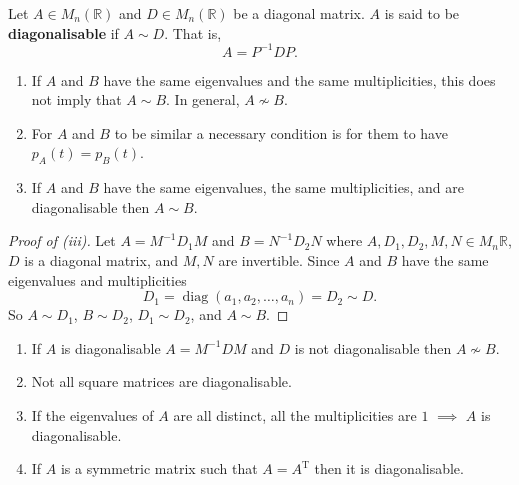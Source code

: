 \begin{definition}
    Let $A \in M_n(\mathbb{R})$ and $D \in M_n(\mathbb{R})$ be a diagonal matrix. $A$ is said to be \textbf{diagonalisable} if $A \sim D$. That is, \[ A = P^{-1} D P. \]
\end{definition}

\begin{remark}
    \begin{enumerate}
        \item If $A$ and $B$ have the same eigenvalues and the same multiplicities, this does not imply that $A \sim B$. In general, $A \not \sim B$.
        
        \item For $A$ and $B$ to be similar a necessary condition is for them to have $p_A(t) = p_B(t)$. 
        
        \item If $A$ and $B$ have the same eigenvalues, the same multiplicities, and are diagonalisable then $A \sim B$.
    \end{enumerate}
\end{remark}

\begin{proof}[Proof of (iii)]
    Let $A = M^{-1} D_1 M$ and $B = N^{-1} D_2 N$ where $A, D_1, D_2, M, N \in M_n{\mathbb{R}}$, $D$ is a diagonal matrix, and $M, N$ are invertible. Since $A$ and $B$ have the same eigenvalues and multiplicities \[ D_1 = \operatorname{diag}(a_1, a_2, \ldots, a_n) = D_2 \sim D. \] So $A \sim D_1$, $B \sim D_2$, $D_1 \sim D_2$, and $A \sim B$.
\end{proof}

\begin{remark}
    \begin{enumerate}
        \item If $A$ is diagonalisable $A = M^{-1} D M$ and $D$ is not diagonalisable then $A \not \sim B$.
        
        \item Not all square matrices are diagonalisable.
        
        \item If the eigenvalues of $A$ are all distinct, all the multiplicities are $1$ $\implies$ $A$ is diagonalisable.
        
        \item If $A$ is a symmetric matrix such that $A = A^{\mathrm{T}}$ then it is diagonalisable.
    \end{enumerate}
\end{remark}

